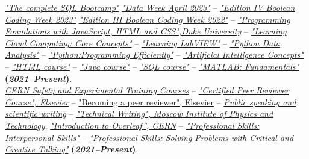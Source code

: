 \documentclass[11pt]{res}
\begin{document}
\begin{resume}
\href{https://udemy-certificate.s3.amazonaws.com/pdf/UC-a4091f64-dc5e-45d2-862a-4775bd87ca68.pdf}{\textit{"The complete SQL Bootcamp"}} \href{https://drive.google.com/file/d/1XgZ86KM6Vocc-9ZNQSlHN9-ljPsDRRSx/view?usp=share_link}{\textit{"Data Week April 2023"}} -- \href{https://drive.google.com/file/d/1LJg_lcj3g8DCjIHbusRzNlulzKLpmO-D/view?usp=share_link}{\textit{"Edition IV Boolean Coding Week 2023"}} \href{https://drive.google.com/file/d/1x15muyjCytZql1GQQzXSIICASMkJIKWh/view?usp=sharing}{\textit{"Edition III Boolean Coding Week 2022"}} -- \href{https://www.coursera.org/account/accomplishments/certificate/QVDWWH3C8MXV}{\textit{"Programming Foundations with JavaScript, HTML and CSS",Duke University}} -- \href{https://drive.google.com/file/d/1QbnkoML6oBqluVR8ciEqyPicE8jnGo6J/view?usp=sharing}{\textit{"Learning Cloud Computing: Core Concepts"}} -- \href{https://drive.google.com/file/d/1rHMOA8m3MLs0F8_AqIUldhX4vzZbFTGQ/view?%usp=sharing}{\textit{"Learning LabVIEW"}} -- \href{https://drive.google.com/file/d/1FxyFXUghhG-g39umhRG-oX6sN0CRhyAk/view?%usp=sharing}{\textit{"Python Data Analysis"}} -- \href{https://drive.google.com/file/d/1xa-h0UXAjloY4ojJNbiFfJ4nO93Q6wJi/view?%usp=sharing}{\textit{"Python:Programming Efficiently"}} -- \href{https://drive.google.com/file/d/1t3VZrkz1vKlDDB1VhK8Rp0oTFCH86xB1/view}{\textit{"Artificial Intelligence Concepts"}} -- \href{https://www.sololearn.com/Certificate/1014-12467510/pdf/}{\textit{"HTML course"}} -- \href{https://www.sololearn.com/Certificate/1068-12467510/pdf/}{\textit{"Java course"}} -- \href{https://www.sololearn.com/Certificate/1060-12467510/pdf/}{\textit{"SQL course"}} -- \href{https://matlabacademy.mathworks.com/progress/share/certificate.html?id=7a4f829d-5d7d-477e-b477-9ef7dc57bc81}{\textit{"MATLAB: Fundamentals"}} \textbf{(\textit{2021--Present})}.\\
\href{https://drive.google.com/file/d/1ERwifUWZs0JV1oRLNBSZiIamxv_cBlR8/view?usp=share_link}{\textit{CERN Safety and Experimental Training Courses}} -- \href{https://drive.google.com/file/d/1Rxk1QI1f8aCSJGvztU9PeFWPQlKvzrhy/view?usp=share_link}{\textit{"Certified Peer Reviewer Course", Elsevier}} -- \href{https://drive.google.com/file/d/1AoAw7MSEIjK0C0Jv55N3kFqmMiM2U9lf/view?usp=share_link}{"Becoming a peer reviewer", Elsevier} -- \href{https://drive.google.com/file/d/119ZkpA4OGFroNh0O9Hs60HvjqiKpUPq0/view?usp=sharing}{\textit{Public speaking and scientific writing}} -- \href{https://www.coursera.org/account/accomplishments/certificate/83WJM6X4DY27}{\textit{"Technical Writing", Moscow Institute of Physics and Technology}}, \href{https://drive.google.com/file/d/1to79c-kiCDjbMWiXxkL1zJY3JnbfbXGx/view}{\textit{"Introduction to Overleaf”, CERN}} -- \href{https://drive.google.com/file/d/1t3VZrkz1vKlDDB1VhK8Rp0oTFCH86xB1/view}{\textit{"Professional Skills: Interpersonal Skills"}} --  \href{https://drive.google.com/file/d/1t3VZrkz1vKlDDB1VhK8Rp0oTFCH86xB1/view}{\textit{"Professional Skills: Solving Problems with Critical and Creative Talking"}} \textbf{(\textit{2021--Present})}.\\


\end{resume}
\end{document}
